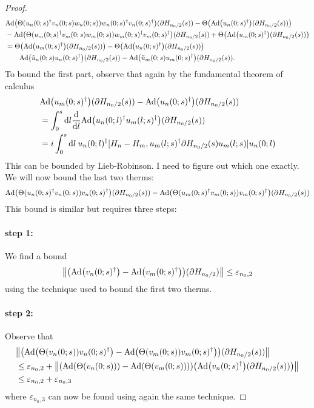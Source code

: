 \documentclass[12pt,a4paper,twoside]{article}
\renewcommand{\d}{\text{d}}
\let\originalleft\left
\let\originalright\right
\renewcommand{\left}{\mathopen{}\mathclose\bgroup\originalleft}
\renewcommand{\right}{\aftergroup\egroup\originalright}
\newcommand{\Ad}[1]{\textrm{Ad}\left(#1\right)}
\theoremstyle{definition}
\numberwithin{equation}{section}
\begin{document}
\begin{proof}
	\begin{align}
		&\Ad{\Theta(u_n(0;s)^\dagger v_n(0;s)w_n(0;s))w_n(0;s)^\dagger v_n(0;s)^\dagger}(\partial H_{n_0/2}(s))-\Theta\left(\Ad{u_n(0;s)^\dagger}(\partial H_{n_0/2}(s))\right)\\
		\nonumber
		&-\Ad{\Theta(u_m(0;s)^\dagger v_m(0;s)w_m(0;s))w_m(0;s)^\dagger v_m(0;s)^\dagger}(\partial H_{n_0/2}(s))+\Theta\left(\Ad{u_m(0;s)^\dagger}(\partial H_{n_0/2}(s))\right)\\
		&=\Theta\left(\Ad{u_m(0;s)^\dagger}(\partial H_{n_0/2}(s))\right)-\Theta\left(\Ad{u_n(0;s)^\dagger}(\partial H_{n_0/2}(s))\right)\\
		\nonumber
		&\qquad \Ad{\tilde{u}_n(0;s)u_n(0;s)^\dagger}(\partial H_{n_0/2}(s))-\Ad{\tilde{u}_m(0;s)u_m(0;s)^\dagger}(\partial H_{n_0/2}(s)).
	\end{align}
	To bound the first part, observe that again by the fundamental theorem of calculus
	\begin{align}
		&\Ad{u_m(0;s)^\dagger}(\partial H_{n_0/2}(s))-\Ad{u_n(0;s)^\dagger}(\partial H_{n_0/2}(s))\\
		&=\int_0^s\d l\frac{\d}{\d l}\Ad{u_n(0;l)^{\dagger}u_m(l;s)^{\dagger}}(\partial H_{n_0/2}(s))\\
		&=i\int_0^s\d l\: u_n(0;l)^{\dagger}[H_n-H_m,u_m(l;s)^{\dagger}\partial H_{n_0/2}(s)u_m(l;s)]u_n(0;l)
	\end{align}
	This can be bounded by Lieb-Robinson. {\color{red}I need to figure out which one exactly.} We will now bound the last two therms:
	\begin{align}
		\Ad{\Theta(u_n(0;s)^\dagger v_n(0;s)) v_n(0;s)^\dagger}(\partial H_{n_0/2}(s))-\Ad{\Theta(u_m(0;s)^\dagger v_m(0;s)) v_m(0;s)^\dagger}(\partial H_{n_0/2}(s))
	\end{align}
	This bound is similar but requires three steps:
	\paragraph{step 1:}We find a bound
	\begin{equation}
		\norm{\left(\Ad{v_n(0;s)^\dagger}-\Ad{v_m(0;s)^\dagger}\right)(\partial H_{n_0/2})}\leq \varepsilon_{n_0,2}
	\end{equation}
	using the technique used to bound the first two therms.
	\paragraph{step 2:}Observe that
	\begin{align}
		&\norm{\left(\Ad{\Theta(v_n(0;s)) v_n(0;s)^\dagger}-\Ad{\Theta(v_m(0;s)) v_m(0;s)^\dagger}\right)(\partial H_{n_0/2}(s))}\\
		&\leq \varepsilon_{n_0,2}+\norm{\left(\Ad{\Theta(v_n(0;s)) }-\Ad{\Theta(v_m(0;s)) }\right)\left(\Ad{v_n(0;s)^\dagger}(\partial H_{n_0/2}(s))\right)}\\
		&\leq \varepsilon_{n_0,2}+\varepsilon_{n_0,3}
	\end{align}
	where $\varepsilon_{n_0,3}$ can now be found using again the same technique.

\end{proof}
\end{document}
